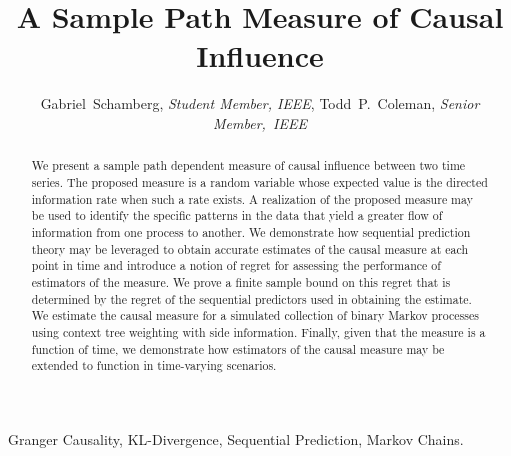 \documentclass[conference]{IEEEtran}
\begin{document}
\title{A Sample Path Measure of Causal Influence}
%

\author{
Gabriel~Schamberg, \emph{Student Member, IEEE},
Todd~P.~Coleman, \emph{Senior Member,~IEEE}
}

\maketitle


\begin{abstract}
We present a sample path dependent measure of causal influence between two time series. The proposed measure is a random variable whose expected value is the directed information rate when such a rate exists. A realization of the proposed measure may be used to identify the specific patterns in the data that yield a greater flow of information from one process to another. We demonstrate how sequential prediction theory may be leveraged to obtain accurate estimates of the causal measure at each point in time and introduce a notion of regret for assessing the performance of estimators of the measure. We prove a finite sample bound on this regret that is determined by the regret of the sequential predictors used in obtaining the estimate. We estimate the causal measure for a simulated collection of binary Markov processes using context tree weighting with side information. Finally, given that the measure is a function of time, we demonstrate how estimators of the causal measure may be extended to function in time-varying scenarios.
\end{abstract}


\begin{IEEEkeywords}
Granger Causality, KL-Divergence, Sequential Prediction, Markov Chains.
\end{IEEEkeywords}

\IEEEpeerreviewmaketitle









\ifCLASSOPTIONcaptionsoff
  \newpage
\fi
\end{document}
